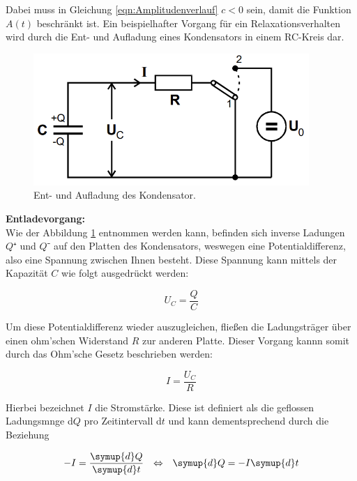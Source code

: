 \noindent Dabei muss in Gleichung \eqref{eqn:Amplitudenverlauf} $c < 0$ sein, damit die Funktion $A(t)$ beschränkt ist.
Ein beispielhafter Vorgang für ein Relaxationsverhalten wird durch die Ent- und Aufladung eines Kondensators in einem 
RC-Kreis dar.

\begin{figure}[H]
\label{fig:Ladungsvorgang}
    \centering
    \includegraphics[height=5cm]{v353_Schaltkreise_1.png}
    \caption{Ent- und Aufladung des Kondensator.}
\end{figure}

\noindent \textbf{Entladevorgang:}\\
\noindent Wie der Abbildung \ref{fig:Ladungsvorgang} entnommen werden kann, befinden sich inverse Ladungen $Q⁺$ und $Q⁻$ auf den Platten 
des Kondensators, weswegen eine Potentialdifferenz, also eine Spannung zwischen Ihnen besteht. Diese Spannung kann mittels 
der Kapazität $C$ wie folgt ausgedrückt werden:

\begin{equation}
\label{eqn:Spannung}
    U_C = \frac{Q}{C}
\end{equation}

\noindent Um diese Potentialdifferenz wieder auszugleichen, fließen die Ladungsträger über einen ohm'schen Widerstand $R$ zur anderen Platte.
Dieser Vorgang kannn somit durch das Ohm'sche Gesetz beschrieben werden:

\begin{equation}
\label{eqn:Ohm}
    I = \frac{U_C}{R}
\end{equation}

\noindent Hierbei bezeichnet $I$ die Stromstärke. Diese ist definiert als die geflossen Ladungsmnge d$Q$ pro Zeitintervall d$t$ und kann dementsprechend
durch die Beziehung

\begin{align}
\label{eqn:Stromstaerke}
    -I &= \frac{\symup{d}Q}{\symup{d}t} &\Leftrightarrow& &\symup{d}Q = -I\symup{d}t 
\end{align}

